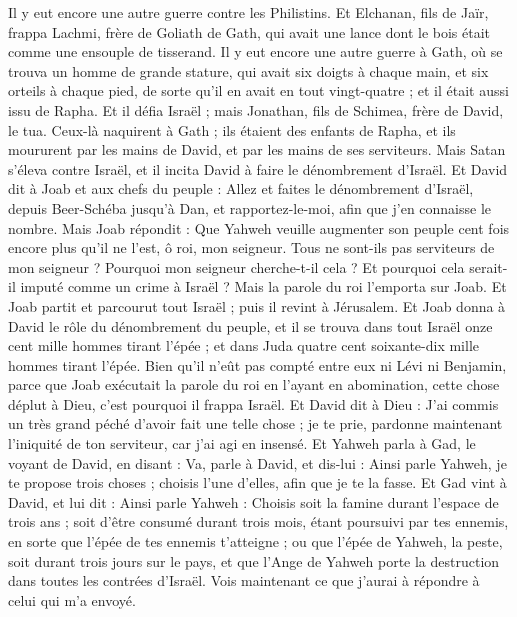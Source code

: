 \begin{multicols}{2}
Il y eut encore une autre guerre contre les Philistins. Et Elchanan, fils de Jaïr, frappa Lachmi, frère de Goliath de Gath, qui avait une lance dont le bois était comme une ensouple de tisserand.
Il y eut encore une autre guerre à Gath, où se trouva un homme de grande stature, qui avait six doigts à chaque main, et six orteils à chaque pied, de sorte qu'il en avait en tout vingt-quatre ; et il était aussi issu de Rapha.
Et il défia Israël ; mais Jonathan, fils de Schimea, frère de David, le tua.
Ceux-là naquirent à Gath ; ils étaient des enfants de Rapha, et ils moururent par les mains de David, et par les mains de ses serviteurs.
\VerseOne{}Mais Satan s'éleva contre Israël, et il incita David à faire le dénombrement d'Israël.
Et David dit à Joab et aux chefs du peuple : Allez et faites le dénombrement d'Israël, depuis Beer-Schéba jusqu'à Dan, et rapportez-le-moi, afin que j’en connaisse le nombre.
Mais Joab répondit : Que Yahweh veuille augmenter son peuple cent fois encore plus qu'il ne l’est, ô roi, mon seigneur. Tous ne sont-ils pas serviteurs de mon seigneur ? Pourquoi mon seigneur cherche-t-il cela ? Et pourquoi cela serait-il imputé comme un crime à Israël ?
Mais la parole du roi l'emporta sur Joab. Et Joab partit et parcourut tout Israël ; puis il revint à Jérusalem.
Et Joab donna à David le rôle du dénombrement du peuple, et il se trouva dans tout Israël onze cent mille hommes tirant l'épée ; et dans Juda quatre cent soixante-dix mille hommes tirant l'épée.
Bien qu'il n'eût pas compté entre eux ni Lévi ni Benjamin, parce que Joab exécutait la parole du roi en l’ayant en abomination,
cette chose déplut à Dieu, c'est pourquoi il frappa Israël.
Et David dit à Dieu : J'ai commis un très grand péché d'avoir fait une telle chose ; je te prie, pardonne maintenant l'iniquité de ton serviteur, car j'ai agi en insensé.
Et Yahweh parla à Gad, le voyant de David, en disant :
Va, parle à David, et dis-lui : Ainsi parle Yahweh, je te propose trois choses ; choisis l'une d'elles, afin que je te la fasse.
Et Gad vint à David, et lui dit : Ainsi parle Yahweh :
Choisis soit la famine durant l'espace de trois ans ; soit d'être consumé durant trois mois, étant poursuivi par tes ennemis, en sorte que l'épée de tes ennemis t'atteigne ; ou que l'épée de Yahweh, la peste, soit durant trois jours sur le pays, et que l'Ange de Yahweh porte la destruction dans toutes les contrées d'Israël. Vois maintenant ce que j'aurai à répondre à celui qui m'a envoyé.

\end{multicols}
